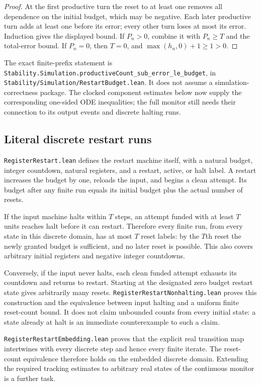 \documentclass[11pt]{article}
\newcommand{\code}[1]{{\small\nolinkurl{#1}}}
\begin{document}
\begin{proof}
At the first productive turn the reset to at least one removes all
dependence on the initial budget, which may be negative. Each later
productive turn adds at least one before its error; every other turn loses
at most its error. Induction gives the displayed bound. If $P_n>0$, combine
it with $P_n\ge T$ and the total-error bound. If $P_n=0$, then $T=0$,
and $\max(h_n,0)+1\ge1>0$.
\end{proof}

The exact finite-prefix statement is
\code{Stability.Simulation.productiveCount_sub_error_le_budget}, in
\code{Stability/Simulation/RestartBudget.lean}. It does not assume a
simulation-correctness package. The clocked component estimates below
now supply the corresponding one-sided ODE inequalities; the full
monitor still needs their connection to its output events and discrete
halting runs.

\subsection{Literal discrete restart runs}

\code{RegisterRestart.lean} defines the restart machine itself, with a
natural budget, integer countdown, natural registers, and a restart,
active, or halt label. A restart increases the budget by one, reloads
the input, and begins a clean attempt. Its budget after any finite run
equals its initial budget plus the actual number of resets.

If the input machine halts within $T$ steps, an attempt funded with at
least $T$ units reaches halt before it can restart. Therefore every
finite run, from every state in this discrete domain, has at most $T$
reset labels: by the $T$th reset the newly granted budget is sufficient,
and no later reset is possible. This also covers arbitrary initial
registers and negative integer countdowns.

Conversely, if the input never halts, each clean funded attempt exhausts
its countdown and returns to restart. Starting at the designated zero
budget restart state gives arbitrarily many resets.
\code{RegisterRestartNonhalting.lean} proves this construction and the
equivalence between input halting and a uniform finite reset-count bound.
It does not claim unbounded counts from every initial state: a state
already at halt is an immediate counterexample to such a claim.

\code{RegisterRestartEmbedding.lean} proves that the explicit real
transition map intertwines with every discrete step and hence every
finite iterate. The reset-count equivalence therefore holds on the
embedded discrete domain. Extending the required tracking estimates to
arbitrary real states of the continuous monitor is a further task.
\end{document}
